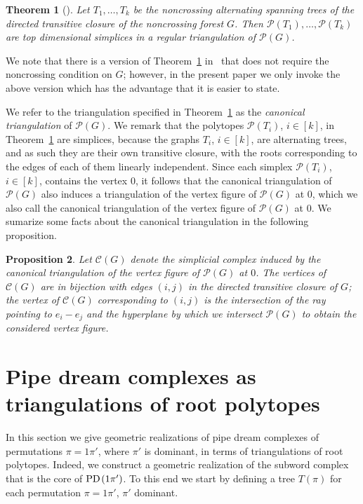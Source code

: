 \documentclass[10pt]{amsart}
\newtheorem{theo}{Theorem}[section]
\newtheorem{prop}[theo]{Proposition}
\theoremstyle{definition}
\numberwithin{equation}{section}
\newcommand*\C{{\mathcal{C}}}
\renewcommand*\P{{\mathcal{P}}}
\newcommand*\+{\smash{\lower2pt\hbox{\rlap{\vrule height14pt}}\raise2pt\hbox{\rlap{\hskip-3pt \vrule height.4pt depth0pt width14.7pt}}}}
\newcommand*{\MK}{\mkern 2mu}
\DeclareMathOperator{\PD}{\textit{PD}\MK}
\begin{document}
\begin{theo}[\cite{root1}]\label{thm:can}
Let $T_1, \dots, T_k$ be the noncrossing alternating spanning trees of the directed transitive closure of the noncrossing forest $G$. Then $\P(T_1), \dots, \P(T_k)$ are top dimensional simplices in a regular triangulation of $\P(G)$.
\end{theo}

We note that there is a version of Theorem~\ref{thm:can} in~\cite{root1} that does not require the noncrossing condition on $G$; however, in the present paper we only invoke the above version which has the advantage that it is easier to state. 

We refer to the triangulation specified in Theorem~\ref{thm:can} as the \emph{canonical triangulation} of $\P(G)$. We remark that the polytopes $\P(T_i)$, $i \in [k]$, in Theorem~\ref{thm:can} are simplices, because the graphs $T_i$, $i\in [k]$, are alternating trees, and as such they are their own transitive closure, with the roots corresponding to the edges of each of them linearly independent. Since each simplex $\P(T_i)$, $i \in [k]$, contains the vertex $0$, it follows that the canonical triangulation of $\P(G)$ also induces a triangulation of the vertex figure of $\P(G)$ at $0$, which we also call the canonical triangulation of the vertex figure of $\P(G)$ at $0$. We sumarize some facts about the canonical triangulation in the following proposition.

\begin{prop}\label{prop:cantriang}
Let $\C(G)$ denote the simplicial complex induced by the canonical triangulation of the vertex figure of $\P(G)$ at $0$. The vertices of $\C(G)$ are in bijection with edges $(i,j)$ in the directed transitive closure of $G$; the vertex of $\C(G)$ corresponding to $(i,j)$ is the intersection of the ray pointing to $e_i-e_j$ and the hyperplane by which we intersect $\P(G)$ to obtain the considered vertex figure.
\end{prop}


\section{Pipe dream complexes as triangulations of root polytopes}\label{sec:constr}

In this section we give geometric realizations of pipe dream complexes of permutations $\pi=1\pi'$, where $\pi'$ is dominant, in terms of triangulations of root polytopes. Indeed, we construct a geometric realization of the subword complex that is the core of $\PD(1\pi')$. To this end we start by defining a tree $T(\pi)$ for each permutation $\pi=1\pi'$, $\pi'$ dominant.
\end{document}
